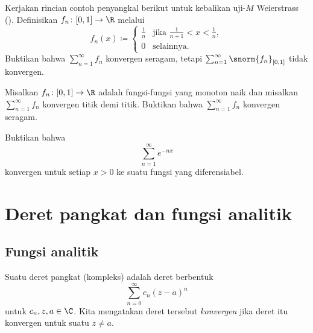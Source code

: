 \begin{exercise}
Kerjakan rincian contoh penyangkal berikut untuk kebalikan
uji-$M$ Weierstrass ().  Definisikan
$f_n \colon [0,1] \to \R$ melalui
\begin{equation*}
f_n(x) \coloneqq
\begin{cases}
\frac{1}{n} & \text{jika } \frac{1}{n+1} < x < \frac{1}{n},\\
0	    & \text{selainnya.}
\end{cases}
\end{equation*}
Buktikan bahwa $\sum_{n=1}^\infty f_n$ konvergen seragam, tetapi
$\sum_{n=1}^\infty \snorm{f_n}_{[0,1]}$
tidak konvergen.
\end{exercise}

\begin{exercise}
Misalkan $f_n \colon [0,1] \to \R$ adalah fungsi-fungsi yang monoton naik dan
misalkan $\sum_{n=1}^\infty f_n$ konvergen titik demi titik.  Buktikan bahwa
$\sum_{n=1}^\infty f_n$
konvergen seragam.
\end{exercise}

\begin{exercise}
Buktikan bahwa
\begin{equation*}
\sum_{n=1}^\infty e^{-nx}
\end{equation*}
konvergen untuk setiap $x > 0$ ke suatu fungsi yang diferensiabel.
\end{exercise}


\sectionnewpage
\section{Deret pangkat dan fungsi analitik}
\label{sec:analfuncs}



\subsection{Fungsi analitik}

Suatu deret pangkat (kompleks) adalah deret berbentuk
\begin{equation*}
\sum_{n=0}^\infty c_n {(z-a)}^n
\end{equation*}
untuk $c_n, z, a \in \C$.  Kita mengatakan deret tersebut
\emph{konvergen} jika deret itu konvergen untuk
suatu $z \neq a$.

